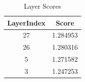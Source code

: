 
\begin{table}[h]
\centering
\begin{tabular}{|c|c|}
\hline
LayerIndex & Score \\
\hline
27 & 1.284953 \\
\hline
26 & 1.280316 \\
\hline
5 & 1.271582 \\
\hline
3 & 1.247253 \\
\hline
\end{tabular}
\caption{Layer Scores}
\end{table}
